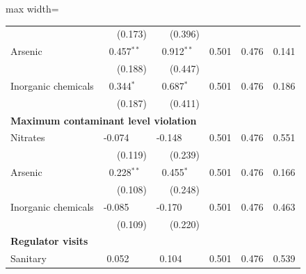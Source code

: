 \begin{table}[htbp]
{\begin{adjustbox}{max width=\linewidth}
\begin{tabular}{lrrrrr}
 & (\phantom{-}0.173)\phantom{$^{***}$} & (\phantom{-}0.396)\phantom{$^{***}$} &  &  &  \\
Arsenic & \phantom{(}\phantom{-}0.457$^{**\phantom{*}}$ & \phantom{(}\phantom{-}0.912$^{**\phantom{*}}$ & \phantom{(}\phantom{-}0.501\phantom{$^{***}$} & \phantom{(}\phantom{-}0.476\phantom{$^{***}$} & \phantom{(}\phantom{-}0.141\phantom{$^{***}$} \\
 & (\phantom{-}0.188)\phantom{$^{***}$} & (\phantom{-}0.447)\phantom{$^{***}$} &  &  &  \\
Inorganic chemicals & \phantom{(}\phantom{-}0.344$^{*\phantom{*}\phantom{*}}$ & \phantom{(}\phantom{-}0.687$^{*\phantom{*}\phantom{*}}$ & \phantom{(}\phantom{-}0.501\phantom{$^{***}$} & \phantom{(}\phantom{-}0.476\phantom{$^{***}$} & \phantom{(}\phantom{-}0.186\phantom{$^{***}$} \\
 & (\phantom{-}0.187)\phantom{$^{***}$} & (\phantom{-}0.411)\phantom{$^{***}$} &  &  &  \\
\multicolumn{6}{l}{\textbf{Maximum contaminant level violation}} \\
Nitrates & \phantom{(}-0.074$^{\phantom{*}\phantom{*}\phantom{*}}$ & \phantom{(}-0.148$^{\phantom{*}\phantom{*}\phantom{*}}$ & \phantom{(}\phantom{-}0.501\phantom{$^{***}$} & \phantom{(}\phantom{-}0.476\phantom{$^{***}$} & \phantom{(}\phantom{-}0.551\phantom{$^{***}$} \\
 & (\phantom{-}0.119)\phantom{$^{***}$} & (\phantom{-}0.239)\phantom{$^{***}$} &  &  &  \\
Arsenic & \phantom{(}\phantom{-}0.228$^{**\phantom{*}}$ & \phantom{(}\phantom{-}0.455$^{*\phantom{*}\phantom{*}}$ & \phantom{(}\phantom{-}0.501\phantom{$^{***}$} & \phantom{(}\phantom{-}0.476\phantom{$^{***}$} & \phantom{(}\phantom{-}0.166\phantom{$^{***}$} \\
 & (\phantom{-}0.108)\phantom{$^{***}$} & (\phantom{-}0.248)\phantom{$^{***}$} &  &  &  \\
Inorganic chemicals & \phantom{(}-0.085$^{\phantom{*}\phantom{*}\phantom{*}}$ & \phantom{(}-0.170$^{\phantom{*}\phantom{*}\phantom{*}}$ & \phantom{(}\phantom{-}0.501\phantom{$^{***}$} & \phantom{(}\phantom{-}0.476\phantom{$^{***}$} & \phantom{(}\phantom{-}0.463\phantom{$^{***}$} \\
 & (\phantom{-}0.109)\phantom{$^{***}$} & (\phantom{-}0.220)\phantom{$^{***}$} &  &  &  \\
\multicolumn{6}{l}{\textbf{Regulator visits}} \\
Sanitary & \phantom{(}\phantom{-}0.052$^{\phantom{*}\phantom{*}\phantom{*}}$ & \phantom{(}\phantom{-}0.104$^{\phantom{*}\phantom{*}\phantom{*}}$ & \phantom{(}\phantom{-}0.501\phantom{$^{***}$} & \phantom{(}\phantom{-}0.476\phantom{$^{***}$} & \phantom{(}\phantom{-}0.539\phantom{$^{***}$} \\

\end{tabular}
\end{adjustbox}}
\end{table}
